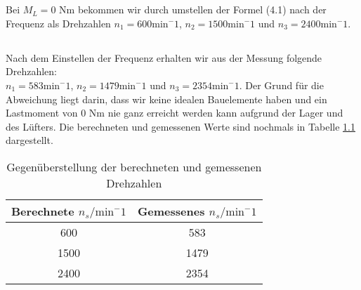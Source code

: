 \chapter{}\label{ex:aufg5}
%
\section{}\label{sec:aufg5a}
%
Bei $M_L = 0$ Nm bekommen wir durch umstellen der Formel (4.1) nach der Frequenz als Drehzahlen $n_1 = 600 \text{min}^-1$, $n_2 = 1500 \text{min}^-1$ und $n_3 = 2400 \text{min}^-1$.
\section{}\label{sec:aufg5b}
%
Nach dem Einstellen der Frequenz erhalten wir aus der Messung folgende Drehzahlen:\\
$n_1 = 583 \text{min}^-1$, $n_2 = 1479 \text{min}^-1$ und $n_3 = 2354 \text{min}^-1$.
Der Grund für die Abweichung liegt darin, dass wir keine idealen Bauelemente haben und ein Lastmoment von 0 Nm nie ganz erreicht werden kann aufgrund der Lager und des Lüfters. Die berechneten und gemessenen Werte sind nochmals in Tabelle \ref{tab:drehzahlen} dargestellt.
\begin{table}[htb]
	\centering
	\begin{tabular}{c | c}
		Berechnete $n_s/\text{min}^-1$ & Gemessenes $n_s/\text{min}^-1$\\\hline
		600 &  583 \\ 
		1500 & 1479 \\ 
		2400 & 2354
	\end{tabular} 
	\caption{Gegenüberstellung der berechneten und gemessenen Drehzahlen}
	\label{tab:drehzahlen}
\end{table}
	
	
